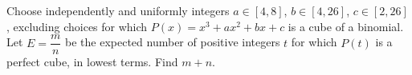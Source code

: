 Choose independently and uniformly integers $a\in[4,8]$, $b\in[4,26]$, $c\in[2,26]$, excluding choices for which $P(x)=x^3+ax^2+bx+c$ is a cube of a binomial. Let $E=\dfrac{m}{n}$ be the expected number of positive integers $t$ for which $P(t)$ is a perfect cube, in lowest terms. Find $m+n$.
